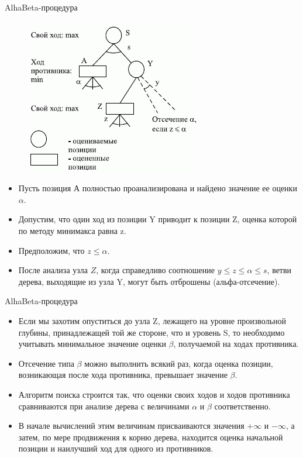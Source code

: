 \documentclass{beamer}
\begin{document}
\begin{frame}{AlhaBeta-процедура}
\begin{figure}[h]
\centering
\includegraphics[scale=0.5]{images/lec05-pic13.png}
\end{figure}
\begin{itemize}
\item Пусть позиция А полностью проанализирована и найдено значение ее оценки $\alpha$. 
\item Допустим, что один ход из позиции Y приводит к позиции Z, оценка которой по методу минимакса равна z.
\item Предположим, что $z \leqslant \alpha$. 
\item После анализа узла $Z$, когда справедливо соотношение $y\leqslant z\leqslant \alpha\leqslant s$, ветви дерева, выходящие из узла Y, могут быть отброшены (альфа-отсечение).
\end{itemize}
\end{frame}

\begin{frame}{AlhaBeta-процедура}
\begin{itemize}
\item Если мы захотим опуститься до узла Z, лежащего на уровне произвольной глубины, принадлежащей той же стороне, что и уровень S, то необходимо учитывать минимальное значение оценки $\beta$, получаемой на ходах противника.
\item Отсечение типа $\beta$ можно выполнить всякий раз, когда оценка позиции, возникающая после хода противника, превышает значение $\beta$. 
\item Алгоритм поиска строится так, что оценки своих ходов и ходов противника сравниваются при анализе дерева с величинами $\alpha$ и $\beta$ соответственно. 
\item В начале вычислений этим величинам присваиваются значения $+\infty$ и $-\infty$, а затем, по мере продвижения к корню дерева, находится оценка начальной позиции и наилучший ход для одного из противников.
\end{itemize}
\end{frame}
\end{document}
